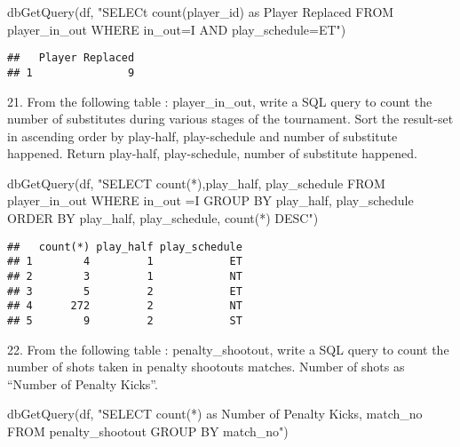 \documentclass[
]{article}
\newenvironment{Shaded}{\begin{snugshade}}{\end{snugshade}}
\newcommand{\FunctionTok}[1]{\textcolor[rgb]{0.00,0.00,0.00}{#1}}
\newcommand{\NormalTok}[1]{#1}
\newcommand{\StringTok}[1]{\textcolor[rgb]{0.31,0.60,0.02}{#1}}
\begin{document}
\begin{Shaded}
\begin{Highlighting}[]
\FunctionTok{dbGetQuery}\NormalTok{(df, }\StringTok{"SELECt  count(player\_id) as \textquotesingle{}Player Replaced\textquotesingle{}}
\StringTok{                FROM player\_in\_out}
\StringTok{                WHERE in\_out=\textquotesingle{}I\textquotesingle{} AND play\_schedule=\textquotesingle{}ET\textquotesingle{}"}\NormalTok{)}
\end{Highlighting}
\end{Shaded}

\begin{verbatim}
##   Player Replaced
## 1               9
\end{verbatim}

21. From the following table : player\_in\_out, write a SQL query to
count the number of substitutes during various stages of the tournament.
Sort the result-set in ascending order by play-half, play-schedule and
number of substitute happened. Return play-half, play-schedule, number
of substitute happened.

\begin{Shaded}
\begin{Highlighting}[]
\FunctionTok{dbGetQuery}\NormalTok{(df, }\StringTok{"SELECT count(*),play\_half, play\_schedule}
\StringTok{                FROM player\_in\_out}
\StringTok{                WHERE in\_out =\textquotesingle{}I\textquotesingle{}}
\StringTok{                GROUP BY play\_half, play\_schedule}
\StringTok{                ORDER BY play\_half, play\_schedule, count(*) DESC"}\NormalTok{)}
\end{Highlighting}
\end{Shaded}

\begin{verbatim}
##   count(*) play_half play_schedule
## 1        4         1            ET
## 2        3         1            NT
## 3        5         2            ET
## 4      272         2            NT
## 5        9         2            ST
\end{verbatim}

22. From the following table : penalty\_shootout, write a SQL query to
count the number of shots taken in penalty shootouts matches. Number of
shots as ``Number of Penalty Kicks''.

\begin{Shaded}
\begin{Highlighting}[]
\FunctionTok{dbGetQuery}\NormalTok{(df, }\StringTok{"SELECT count(*) as \textquotesingle{}Number of Penalty Kicks\textquotesingle{}, match\_no}
\StringTok{                FROM penalty\_shootout}
\StringTok{                GROUP BY match\_no"}\NormalTok{)}
\end{Highlighting}
\end{Shaded}
\end{document}
